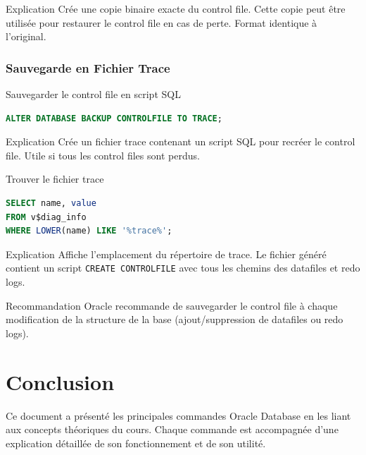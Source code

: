\documentclass[12pt,a4paper]{article}
\begin{document}
\begin{explication}{Explication}
Crée une copie binaire exacte du control file. Cette copie peut être utilisée pour restaurer le control file en cas de perte. Format identique à l'original.
\end{explication}

\subsubsection{Sauvegarde en Fichier Trace}

\begin{commande}{Sauvegarder le control file en script SQL}
\begin{lstlisting}[language=SQL]
ALTER DATABASE BACKUP CONTROLFILE TO TRACE;
\end{lstlisting}
\end{commande}

\begin{explication}{Explication}
Crée un fichier trace contenant un script SQL pour recréer le control file. Utile si tous les control files sont perdus.
\end{explication}

\begin{commande}{Trouver le fichier trace}
\begin{lstlisting}[language=SQL]
SELECT name, value 
FROM v$diag_info 
WHERE LOWER(name) LIKE '%trace%';
\end{lstlisting}
\end{commande}

\begin{explication}{Explication}
Affiche l'emplacement du répertoire de trace. Le fichier généré contient un script \texttt{CREATE CONTROLFILE} avec tous les chemins des datafiles et redo logs.
\end{explication}

\begin{attention}{Recommandation}
Oracle recommande de sauvegarder le control file à chaque modification de la structure de la base (ajout/suppression de datafiles ou redo logs).
\end{attention}

\section{Conclusion}

Ce document a présenté les principales commandes Oracle Database en les liant aux concepts théoriques du cours. Chaque commande est accompagnée d'une explication détaillée de son fonctionnement et de son utilité.
\end{document}
